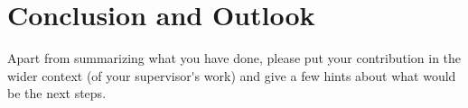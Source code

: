 \section{Conclusion and Outlook}
Apart from summarizing what you have done, please put your contribution in the wider context (of your supervisor\'{}s work) and give a few hints about what would be the next steps.